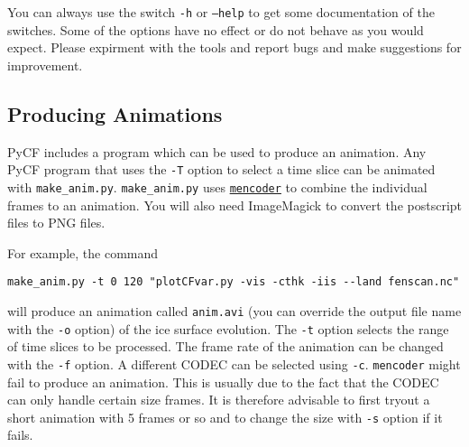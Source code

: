 You can always use the switch \texttt{-h} or \texttt{--help} to get some documentation of the switches. Some of the options have no effect or do not behave as you would expect. Please expirment with the tools and report bugs and make suggestions for improvement. 










\subsection{Producing Animations}
PyCF includes a program which can be used to produce an animation. Any PyCF program that uses the \texttt{-T} option to select a time slice can be animated with \texttt{make\_anim.py}. \texttt{make\_anim.py} uses \href{http://www.mplayerhq.hu/homepage/design7/news.html}{\texttt{mencoder}} to combine the individual frames to an animation. You will also need ImageMagick to convert the postscript files to PNG files.

For example, the command
\begin{verbatim}
make_anim.py -t 0 120 "plotCFvar.py -vis -cthk -iis --land fenscan.nc"
\end{verbatim}
will produce an animation called \texttt{anim.avi} (you can override the output file name with the \texttt{-o} option) of the ice surface evolution. The \texttt{-t} option selects the range of time slices to be processed. The frame rate of the animation can be changed with the \texttt{-f} option. A different CODEC can be selected using \texttt{-c}. \texttt{mencoder} might fail to produce an animation. This is usually due to the fact that the CODEC can only handle certain size frames. It is therefore advisable to first tryout a short animation with 5 frames or so and to change the size with \texttt{-s} option if it fails.
